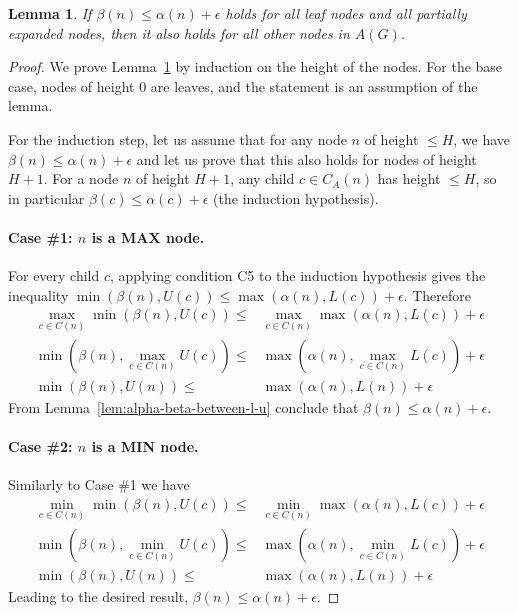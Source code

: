 \documentclass[letterpaper]{article} %
\newtheorem{lemma}{Lemma}
\newcommand{\pess}{\mathit{L}}
\newcommand{\opti}{\mathit{U}}
\begin{document}
\begin{lemma}
If $\beta(n)\leq \alpha(n)+\epsilon$ holds for all leaf nodes and all partially expanded nodes, then it also holds for all other nodes in $A(G)$. 
\label{lem:bounded-beta}
\end{lemma}
\begin{proof}
We prove Lemma~\ref{lem:bounded-beta} by induction on the height of the nodes.
For the base case, nodes of height 0 are leaves, and the statement is an assumption of the lemma.

For the induction step, let us assume that for any node $n$ of height $\leq H$, we have $\beta(n)\leq \alpha(n)+\epsilon$ and let us prove that this also holds for nodes of height $H+1$.
For a node $n$ of height $H+1$, any child $c \in C_A(n)$ has height $\leq H$, so in particular $\beta(c)\leq \alpha(c)+\epsilon$ (the induction hypothesis).

\paragraph{Case \#1: $n$ is a MAX node.}
For every child $c$, applying condition C5 to the induction hypothesis gives the inequality
$\min(\beta(n), \opti(c)) \leq \max(\alpha(n), \pess(c))+\epsilon$.
Therefore 
\begin{align}
\!\!\max_{c \in C(n)} \!\!\min(\beta(n), \opti(c)) \leq & \!\!\max_{c \in C(n)} \!\!\max(\alpha(n), \pess(c))+\epsilon\\
\!\!\min(\beta(n), \!\!\max_{c \in C(n)}\!\!\opti(c)) \leq & \max(\alpha(n), \!\!\max_{c \in C(n)}\!\!\pess(c))+\epsilon\\
\!\!\min(\beta(n), \opti(n)) \leq & \max(\alpha(n), \pess(n))+\epsilon
\end{align}
From Lemma~\ref{lem:alpha-beta-between-l-u} conclude that $\beta(n) \leq \alpha(n) + \epsilon$.

\paragraph{Case \#2: $n$ is a MIN node.}
Similarly to Case \#1 we have 
\begin{align}
\!\!\min_{c \in C(n)} \!\!\min(\beta(n), \opti(c)) \leq & \!\!\min_{c \in C(n)} \!\!\max(\alpha(n), \pess(c))+\epsilon\\
\!\!\min(\beta(n), \!\!\min_{c \in C(n)}\!\!\opti(c)) \leq & \max(\alpha(n), \!\!\min_{c \in C(n)}\!\!\pess(c))+\epsilon\\
\!\!\min(\beta(n), \opti(n)) \leq & \max(\alpha(n), \pess(n))+\epsilon
\end{align}
Leading to the desired result, $\beta(n) \leq \alpha(n) + \epsilon$.


\end{proof}
\end{document}
